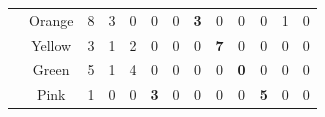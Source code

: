 \begin{table}[]
{\begin{tabular}{ccccccccccccc}
\multicolumn{1}{|l|}{}                                & \multicolumn{1}{c|}{Orange}    & \multicolumn{1}{c|}{8}                                    & \multicolumn{1}{c|}{3}                                    & \multicolumn{1}{c|}{0}                                    & \multicolumn{1}{c|}{0}                                  & \multicolumn{1}{c|}{0}                                  & \multicolumn{1}{c|}{\cellcolor[HTML]{32CB00}\textbf{3}} & \multicolumn{1}{c|}{0}                                  & \multicolumn{1}{c|}{0}                                  & \multicolumn{1}{c|}{0}                                  & \multicolumn{1}{c|}{1}                                  & \multicolumn{1}{c|}{0}                                  \\ \cline{2-13} 
\multicolumn{1}{|l|}{}                                & \multicolumn{1}{c|}{Yellow}    & \multicolumn{1}{c|}{3}                                    & \multicolumn{1}{c|}{1}                                    & \multicolumn{1}{c|}{2}                                    & \multicolumn{1}{c|}{0}                                  & \multicolumn{1}{c|}{0}                                  & \multicolumn{1}{c|}{0}                                  & \multicolumn{1}{c|}{\cellcolor[HTML]{32CB00}\textbf{7}} & \multicolumn{1}{c|}{0}                                  & \multicolumn{1}{c|}{0}                                  & \multicolumn{1}{c|}{0}                                  & \multicolumn{1}{c|}{0}                                  \\ \cline{2-13} 
\multicolumn{1}{|l|}{}                                & \multicolumn{1}{c|}{Green}     & \multicolumn{1}{c|}{5}                                    & \multicolumn{1}{c|}{1}                                    & \multicolumn{1}{c|}{4}                                    & \multicolumn{1}{c|}{0}                                  & \multicolumn{1}{c|}{0}                                  & \multicolumn{1}{c|}{0}                                  & \multicolumn{1}{c|}{0}                                  & \multicolumn{1}{c|}{\cellcolor[HTML]{C0C0C0}\textbf{0}} & \multicolumn{1}{c|}{0}                                  & \multicolumn{1}{c|}{0}                                  & \multicolumn{1}{c|}{0}                                  \\ \cline{2-13} 
\multicolumn{1}{|l|}{}                                & \multicolumn{1}{c|}{Pink}      & \multicolumn{1}{c|}{1}                                    & \multicolumn{1}{c|}{0}                                    & \multicolumn{1}{c|}{0}                                    & \multicolumn{1}{c|}{\cellcolor[HTML]{FE0000}\textbf{3}} & \multicolumn{1}{c|}{0}                                  & \multicolumn{1}{c|}{0}                                  & \multicolumn{1}{c|}{0}                                  & \multicolumn{1}{c|}{0}                                  & \multicolumn{1}{c|}{\cellcolor[HTML]{32CB00}\textbf{5}} & \multicolumn{1}{c|}{0}                                  & \multicolumn{1}{c|}{0}                                  \\ \cline{2-13} 

\end{tabular}}
\end{table}
